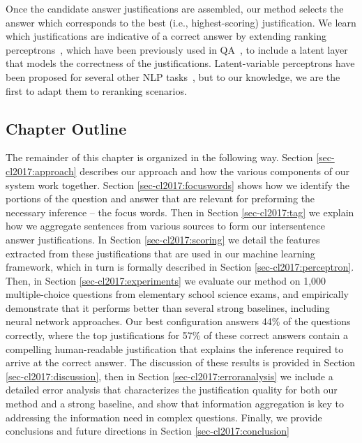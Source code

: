 Once the candidate answer justifications are assembled, our method selects the answer which corresponds to the best (i.e., highest-scoring) justification.  We learn which justifications are indicative of a correct answer by extending ranking perceptrons~\citep{Shen:Joshi:2005}, which have been previously used in QA~\citep{Surdeanu:11}, to include a latent layer that models the correctness of the justifications. Latent-variable perceptrons have been proposed for several other NLP tasks~\citep{liang2006end,zettlemoyer2007online,sun2009latent,hoffmann2011knowledge,fernandes2012latent,bjorkelund2014learning}, but to our knowledge, we are the first to adapt them to reranking scenarios. 

\subsection{Chapter Outline}

The remainder of this chapter is organized in the following way.  Section \ref{sec-cl2017:approach} describes our approach and how the various components of our system work together.  Section \ref{sec-cl2017:focuswords} shows how we identify the portions of the question and answer that are relevant for preforming the necessary inference -- the focus words.  Then in Section \ref{sec-cl2017:tag} we explain how we aggregate sentences from various sources to form our intersentence answer justifications.  In Section \ref{sec-cl2017:scoring} we detail the features extracted from these justifications that are used in our machine learning framework, which in turn is formally described in Section \ref{sec-cl2017:perceptron}.  
Then, in Section \ref{sec-cl2017:experiments} we evaluate our method on 1,000 multiple-choice questions from elementary school science exams, and empirically demonstrate that it performs better than several strong baselines, including neural network approaches. Our best configuration answers 44\% of the questions correctly, where the top justifications for 57\% of these correct answers contain a compelling human-readable justification that explains the inference required to arrive at the correct answer.  
The discussion of these results is provided in Section \ref{sec-cl2017:discussion}, then in Section \ref{sec-cl2017:erroranalysis}
we include a detailed error analysis that characterizes the justification quality for both our method and a strong baseline, and show that information aggregation is key to addressing the information need in complex questions.  Finally, we provide conclusions and future directions in Section \ref{sec-cl2017:conclusion}


